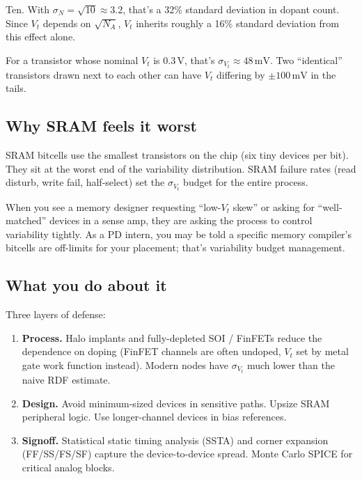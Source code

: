 \documentclass[11pt]{article}
\begin{document}
Ten. With $\sigma_N = \sqrt{10} \approx 3.2$, that's a 32\% standard deviation in dopant count. Since $V_t$ depends on $\sqrt{N_A}$, $V_t$ inherits roughly a 16\% standard deviation from this effect alone.

For a transistor whose nominal $V_t$ is $0.3\,\text{V}$, that's $\sigma_{V_t} \approx 48\,\text{mV}$. Two ``identical'' transistors drawn next to each other can have $V_t$ differing by $\pm 100\,\text{mV}$ in the tails.

\subsection{Why SRAM feels it worst}

SRAM bitcells use the smallest transistors on the chip (six tiny devices per bit). They sit at the worst end of the variability distribution. SRAM failure rates (read disturb, write fail, half-select) set the $\sigma_{V_t}$ budget for the entire process.

\begin{pdnote}
When you see a memory designer requesting ``low-$V_t$ skew'' or asking for ``well-matched'' devices in a sense amp, they are asking the process to control variability tightly. As a PD intern, you may be told a specific memory compiler's bitcells are off-limits for your placement; that's variability budget management.
\end{pdnote}

\subsection{What you do about it}

Three layers of defense:
\begin{enumerate}
\item \textbf{Process.} Halo implants and fully-depleted SOI / FinFETs reduce the dependence on doping (FinFET channels are often undoped, $V_t$ set by metal gate work function instead). Modern nodes have $\sigma_{V_t}$ much lower than the naive RDF estimate.
\item \textbf{Design.} Avoid minimum-sized devices in sensitive paths. Upsize SRAM peripheral logic. Use longer-channel devices in bias references.
\item \textbf{Signoff.} Statistical static timing analysis (SSTA) and corner expansion (FF/SS/FS/SF) capture the device-to-device spread. Monte Carlo SPICE for critical analog blocks.
\end{enumerate}
\end{document}
